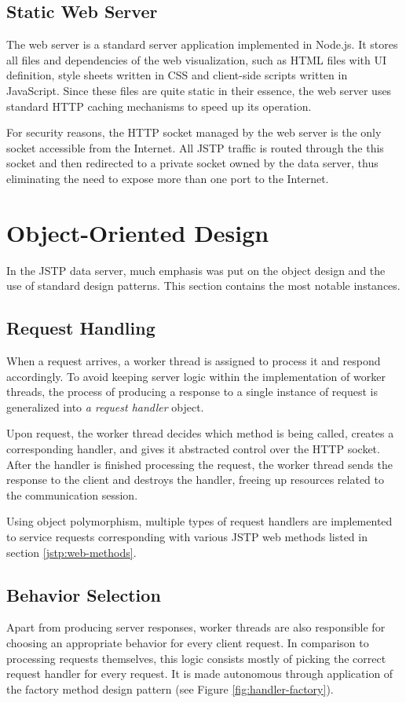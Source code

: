 \subsection{Static Web Server}
The web server is a standard server application implemented in Node.js. It stores all files and dependencies of the web visualization, such as HTML files with UI definition, style sheets written in CSS and client-side scripts written in JavaScript. Since these files are quite static in their essence, the web server uses standard HTTP caching mechanisms to speed up its operation.

For security reasons, the HTTP socket managed by the web server is the only socket accessible from the Internet. All JSTP traffic is routed through the this socket and then redirected to a private socket owned by the data server, thus eliminating the need to expose more than one port to the Internet.

\section{Object-Oriented Design}
In the JSTP data server, much emphasis was put on the object design and the use of standard design patterns. This section contains the most notable instances.

\subsection{Request Handling}
When a request arrives, a worker thread is assigned to process it and respond accordingly. To avoid keeping server logic within the implementation of worker threads, the process of producing a response to a single instance of request is generalized into \textit{a request handler} object.

Upon request, the worker thread decides which method is being called, creates a corresponding handler, and gives it abstracted control over the HTTP socket. After the handler is finished processing the request, the worker thread sends the response to the client and destroys the handler, freeing up resources related to the communication session.

Using object polymorphism, multiple types of request handlers are implemented to service requests corresponding with various JSTP web methods listed in section \ref{jstp:web-methods}.

\subsection{Behavior Selection}
Apart from producing server responses, worker threads are also responsible for choosing an appropriate behavior for every client request. In comparison to processing requests themselves, this logic consists mostly of picking the correct request handler for every request. It is made autonomous through application of the factory method design pattern (see Figure \ref{fig:handler-factory}).

